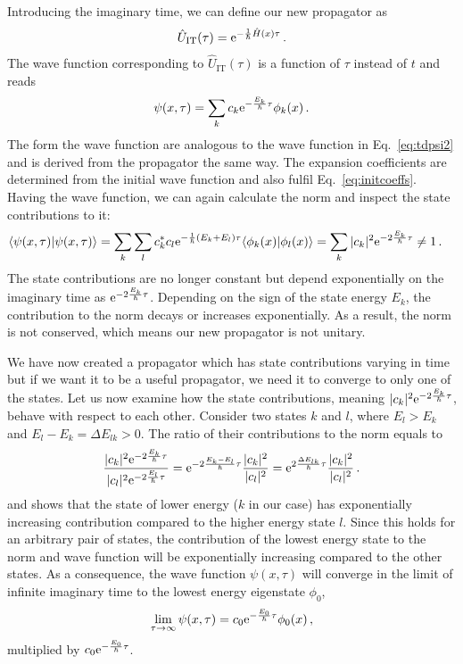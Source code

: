 Introducing the imaginary time, we can define our new propagator as
\begin{equation}
    \hat{U}_\mathrm{IT}(\tau) = \mathrm{e}^{-\frac{1}{\hbar}\hat{H}(x)\tau} \, .
\end{equation}
The wave function corresponding to $\hat{U}_\mathrm{IT}(\tau)$ is a function of $\tau$ instead of $t$ and reads
\begin{equation}
    \psi(x,\tau) = \sum_k c_k \mathrm{e}^{-\frac{E_k}{\hbar}\tau}\phi_k(x) \, .
\end{equation}
The form the wave function are analogous to the wave function in Eq.~\eqref{eq:tdpsi2} and is derived from the propagator the same way. The expansion coefficients are determined from the initial wave function and also fulfil Eq.~\eqref{eq:initcoeffs}.
Having the wave function, we can again calculate the norm and inspect the state contributions to it:
\begin{align}
    \langle\psi(x,\tau)|\psi(x,\tau)\rangle &= \sum_k \sum_l c_k^* c_l  \mathrm{e}^{-\frac{1}{\hbar}(E_k + E_l) \tau} \langle\phi_k(x)|\phi_l(x)\rangle =\sum_k |c_k|^2  \mathrm{e}^{-2\frac{E_k}{\hbar} \tau} \neq 1 \, .
\end{align}
The state contributions are no longer constant but depend exponentially on the imaginary time as $\mathrm{e}^{-2\frac{E_k}{\hbar} \tau}$. Depending on the sign of the state energy $E_k$, the contribution to the norm decays or increases exponentially. As a result, the norm is not conserved, which means our new propagator is not unitary.

We have now created a propagator which has state contributions varying in time but if we want it to be a useful propagator, we need it to converge to only one of the states. Let us now examine how the state contributions, meaning $|c_k|^2  \mathrm{e}^{-2\frac{E_k}{\hbar} \tau}$, behave with respect to each other. Consider two states $k$ and $l$, where $E_l > E_k$ and $E_l - E_k = \Delta E_{lk} > 0$. The ratio of their contributions to the norm equals to
\begin{equation}
    \frac{|c_k|^2  \mathrm{e}^{-2\frac{E_k}{\hbar}\tau}}{|c_l|^2  \mathrm{e}^{-2\frac{E_l}{\hbar}\tau}} =  \mathrm{e}^{-2\frac{E_k - E_l}{\hbar}\tau} \frac{|c_k|^2}{|c_l|^2}  = \mathrm{e}^{2\frac{\Delta E_{lk}}{\hbar}\tau} \frac{|c_k|^2}{|c_l|^2} \, .
\end{equation}
and shows that the state of lower energy ($k$ in our case) has exponentially increasing contribution compared to the higher energy state $l$. Since this holds for an arbitrary pair of states, the contribution of the lowest energy state to the norm and wave function will be exponentially increasing compared to the other states. As a consequence, the wave function $\psi(x,\tau)$ will converge in the limit of infinite imaginary time to the lowest energy eigenstate $\phi_0$, 
\begin{equation}
    \lim_{\tau\to\infty} \psi(x,\tau) = c_0 \mathrm{e}^{-\frac{E_0}{\hbar}\tau} \phi_0(x) \, ,
\end{equation}
multiplied by $c_0 \mathrm{e}^{-\frac{E_0}{\hbar}\tau}$.


